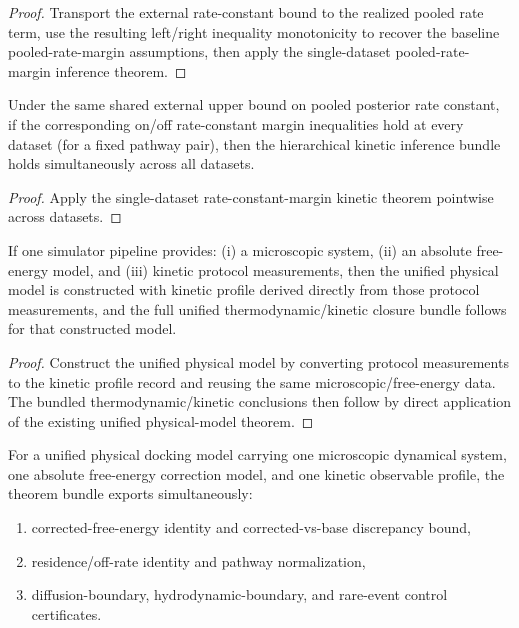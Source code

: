 \begin{proof}
Transport the external rate-constant bound to the realized pooled rate term, use the resulting left/right inequality monotonicity to recover the baseline pooled-rate-margin assumptions, then apply the single-dataset pooled-rate-margin inference theorem.
\end{proof}

\begin{theorem}\label{thm:hierarchical-kinetic-replicate-inference-rate-constant-margins-all-datasets}
Under the same shared external upper bound on pooled posterior rate constant, if the corresponding on/off rate-constant margin inequalities hold at every dataset (for a fixed pathway pair), then the hierarchical kinetic inference bundle holds simultaneously across all datasets.
\end{theorem}

\begin{proof}
Apply the single-dataset rate-constant-margin kinetic theorem pointwise across datasets.
\end{proof}

\begin{theorem}\label{thm:unified-simulator-kinetic-derivation}
If one simulator pipeline provides: (i) a microscopic system, (ii) an absolute free-energy model, and (iii) kinetic protocol measurements, then the unified physical model is constructed with kinetic profile derived directly from those protocol measurements, and the full unified thermodynamic/kinetic closure bundle follows for that constructed model.
\end{theorem}

\begin{proof}
Construct the unified physical model by converting protocol measurements to the kinetic profile record and reusing the same microscopic/free-energy data. The bundled thermodynamic/kinetic conclusions then follow by direct application of the existing unified physical-model theorem.
\end{proof}

\begin{theorem}\label{thm:unified-thermo-kinetic-physical-model}
For a unified physical docking model carrying one microscopic dynamical system, one absolute free-energy correction model, and one kinetic observable profile, the theorem bundle exports simultaneously:
\begin{enumerate}
\item corrected-free-energy identity and corrected-vs-base discrepancy bound,
\item residence/off-rate identity and pathway normalization,
\item diffusion-boundary, hydrodynamic-boundary, and rare-event control certificates.
\end{enumerate}
\end{theorem}

